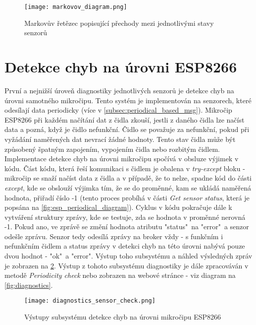 \begin{figure}[H]
  \centering
  \texttt{[image: markovov\_diagram.png]}
  \caption{Markovův řetězec popisující přechody mezi jednotlivými stavy senzorů}
  \label{fig:markovov_diagram}
\end{figure}  

\section{Detekce chyb na úrovni ESP8266} \label{sec:error_detection_esp}
První a nejnižší úroveň diagnostiky jednotlivých senzorů je detekce chyb na úrovni samotného mikročipu. Tento systém je implementován na senzorech, které odesílají data periodicky (více v \cref{subsec:periodical_based_msg}). Mikročip ESP8266 při každém načítání dat z čidla zkouší, jestli z daného čidla lze načíst data a pozná, když je čidlo nefunkční. Čidlo se považuje za nefunkční, pokud při vyžádání naměřených dat nevrací žádné hodnoty. Tento stav čidla může být způsobený špatným zapojením, vypojením čidla nebo rozbitým čidlem. Implementace detekce chyb na úrovni mikročipu spočívá v obsluze výjimek v kódu. Část kódu, která řeší komunikaci s čidlem je obalena v \textit{try-except} bloku - mikročip se snaží načíst data z čidla a v případě, že to nelze, spadne kód do části \textit{except}, kde se obslouží výjimka tím, že se do proměnné, kam se ukládá naměřená hodnota, přiřadí číslo -1 (tento proces probíhá v části \textit{Get sensor status}, která je popsána na \cref{fig:esp_periodical_diagram}). Cyklus v kódu pokračuje dále k vytváření struktury zprávy, kde se testuje, zda se hodnota v proměnné nerovná -1. Pokud ano, ve zprávě se změní hodnota atributu "status"\ na "error"\ a senzor odešle zprávu. Senzor tedy odesílá zprávy na broker vždy - s funkčním i nefunkčním čidlem a status zprávy v detekci chyb na této úrovni nabývá pouze dvou hodnot - "ok"\ a "error". Výstup toho subsystému a náhled výsledných zpráv je zobrazen na \cref{fig:diagnostics_sensor_check}. Výstup z tohoto subsystému diagnostiky je dále zpracováván v metodě \textit{Periodicity check} nebo zobrazen na webové stránce - viz diagram na \cref{fig:diagnostics}.

\begin{figure}[H]
  \centering
  \texttt{[image: diagnostics\_sensor\_check.png]}
  \caption{Výstupy subsystému detekce chyb na úrovni mikročipu ESP8266}
  \label{fig:diagnostics_sensor_check}
\end{figure} 

